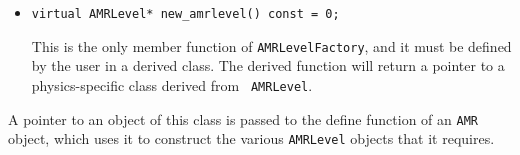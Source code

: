 \begin{itemize}

\item
\begin{verbatim}
virtual AMRLevel* new_amrlevel() const = 0;
\end{verbatim}
This is the only member function of {\tt AMRLevelFactory}, and it must
be defined by the user in a derived class. The derived function will
return a pointer to a physics-specific class derived from {\tt
AMRLevel}.

\end{itemize}
A pointer to an object of this class is passed to the 
define function of an {\tt AMR} object, which uses it to construct the 
various {\tt AMRLevel} objects that it requires.
